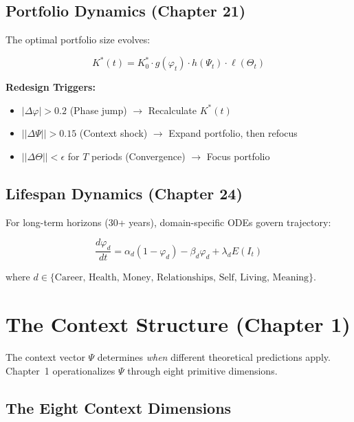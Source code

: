 \subsection{Portfolio Dynamics (Chapter 21)}

The optimal portfolio size evolves:

\begin{equation}
\boxed{
K^*(t) = K^*_0 \cdot g(\varphi_t) \cdot h(\Psi_t) \cdot \ell(\Theta_t)
}
\label{eq:mp-kstar-dynamics}
\end{equation}

\textbf{Redesign Triggers:}
\begin{itemize}
\item $|\Delta\varphi| > 0.2$ (Phase jump) $\to$ Recalculate $K^*(t)$
\item $||\Delta\Psi|| > 0.15$ (Context shock) $\to$ Expand portfolio, then refocus
\item $||\Delta\Theta|| < \epsilon$ for $T$ periods (Convergence) $\to$ Focus portfolio
\end{itemize}

\subsection{Lifespan Dynamics (Chapter 24)}

For long-term horizons (30+ years), domain-specific ODEs govern trajectory:

\begin{equation}
\frac{d\varphi_d}{dt} = \alpha_d (1 - \varphi_d) - \beta_d \varphi_d + \lambda_d E(I_t)
\label{eq:mp-lifespan}
\end{equation}

where $d \in \{\text{Career, Health, Money, Relationships, Self, Living, Meaning}\}$.

\section{The Context Structure (Chapter 1)}
\label{sec:mp-context-structure}

The context vector $\Psi$ determines \textit{when} different theoretical predictions apply.
Chapter~1 operationalizes $\Psi$ through eight primitive dimensions.

\subsection{The Eight Context Dimensions}

